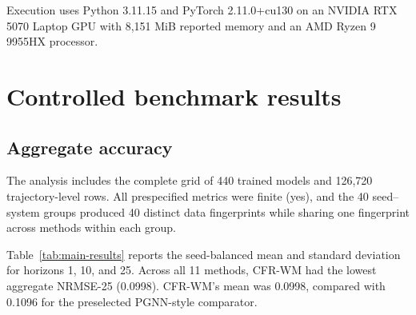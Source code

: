 \documentclass[pdflatex,sn-basic]{sn-jnl}
\newcommand{\CFRNRMSE}{0.0998}
\newcommand{\PGNNNRMSE}{0.1096}
\newcommand{\BestMethod}{CFR-WM}
\newcommand{\BestNRMSE}{0.0998}
\newcommand{\AllMetricsFinite}{yes}
\newcommand{\UniqueDataHashes}{40}
\newcommand{\ConfirmatoryRuns}{440}
\newcommand{\ConfirmatoryTrajectories}{126{,}720}
\begin{document}
Execution uses Python 3.11.15 and PyTorch 2.11.0+cu130 on an NVIDIA RTX 5070
Laptop GPU with 8,151 MiB reported memory and an AMD Ryzen 9 9955HX processor.

\section{Controlled benchmark results}

\subsection{Aggregate accuracy}

The analysis includes the complete grid of \ConfirmatoryRuns{}
trained models and \ConfirmatoryTrajectories{} trajectory-level rows. All
prespecified metrics were finite (\AllMetricsFinite), and the 40 seed--system
groups produced \UniqueDataHashes{} distinct data fingerprints while sharing
one fingerprint across methods within each group.

Table~\ref{tab:main-results} reports the seed-balanced mean and standard
deviation for horizons 1, 10, and 25. Across all 11 methods, \BestMethod{}
had the lowest aggregate NRMSE-25 (\BestNRMSE). CFR-WM's mean was
\CFRNRMSE{}, compared with \PGNNNRMSE{} for the preselected PGNN-style comparator.
\end{document}
